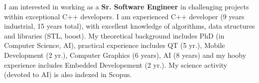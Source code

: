 
I am interested in working as a \textbf{Sr. Software Engineer} in challenging projects within exceptional C++ developers. I am experienced C++ developer (9 years industrial, 15 years total), with excellent knowledge of algorithms, data structures and libraries (STL, boost). My theoretical background includes PhD (in Computer Science, AI), practical experience includes QT (5 yr.), Mobile Development (2 yr.), Computer Graphics (6 years), AI (8 years) and my hooby experience includes Embedded Developement (2 yr.). My science activity (devoted to AI) is also indexed in Scopus.